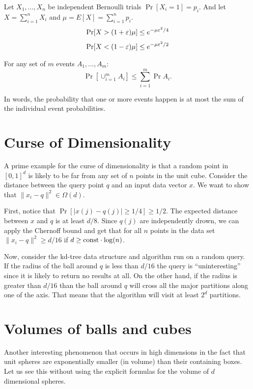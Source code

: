 \documentclass{article}
\begin{document}
\begin{lemma}
Let $X_1,\ldots,X_n$ be independent Bernoulli trials $\Pr[X_i=1] = p_i$. 
And let $X = \sum_{i=1}^{n}X_i$ and $\mu = E[X] = \sum_{i=1}^{n}p_i$.
\begin{equation}
\Pr[X > (1 + \varepsilon)\mu] \le e^{-\mu \varepsilon^2/4}
\end{equation} 
\begin{equation}
\Pr[X < (1 - \varepsilon)\mu] \le e^{-\mu \varepsilon^2/2}
\end{equation} 
\end{lemma}


\begin{lemma}
For any set of $m$ events $A_1,\ldots,A_m$:
\[
\Pr[\cup_{i=1}^{m}A_i] \le \sum_{i=1}^{m}\Pr{A_i}.
\]
\end{lemma}
In words, the probability that one or more events happen is at most the sum of the 
individual event probabilities. 




\section{Curse of Dimensionality}
A prime example for the curse of dimensionality is that a random point in $[0,1]^d$ is likely to be far from any set of $n$ points in the unit cube.
Consider the distance between the query point $q$ and an input data vector $x$.
We want to show that $\|x_i-q\|^2 \in \Omega(d)$.

First, notice that $\Pr[|x(j)- q(j)| \ge 1/4] \ge 1/2$. The expected distance between $x$ and $q$ is at least $d/8$.
Since $q(j)$ are independently drown, we can apply the Chernoff bound and get that for all $n$ points in the data set
$\|x_i-q\|^2 \ge d/16$ if $d \ge {\operatorname{const}}\cdot\log(n)$.

Now, consider the kd-tree data structure and algorithm run on a random query.
If the radius of the ball around $q$ is less than $d/16$ the query is ``uninteresting'' since it is likely to return no results at all.
On the other hand, if the radius is greater than $d/16$ than the ball around $q$ will cross all the major partitions 
along one of the axis. That means that the algorithm will visit at least $2^d$ partitions.


\section{Volumes of balls and cubes}
Another interesting phenomenon that occurs in high dimensions in the fact that unit spheres 
are exponentially smaller (in volume) than their containing boxes.
Let us see this without using the explicit formulas for the volume of $d$ dimensional spheres.
\end{document}

